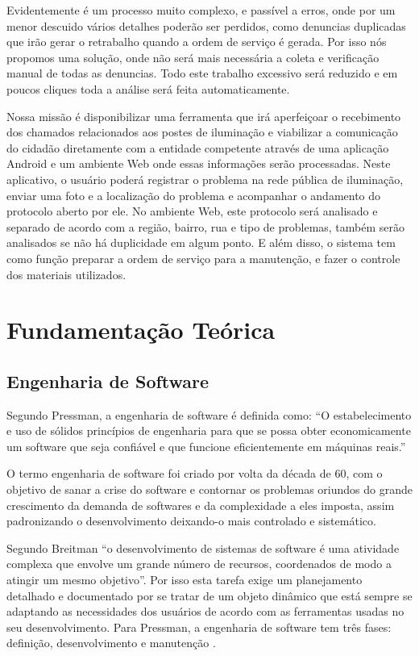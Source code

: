 \documentclass[
	article,			%
	11pt,				%
	oneside,			%
	a4paper,			%
	english,			%
	brazil,				%
	sumario=tradicional
	]{abntex2}
\begin{document}
Evidentemente é um processo muito complexo, e passível a erros, onde por um menor descuido vários detalhes poderão ser perdidos, como denuncias duplicadas que irão gerar o retrabalho quando a ordem de serviço é gerada.
Por isso nós propomos uma solução, onde não será mais necessária a coleta e verificação manual de todas as denuncias.
Todo este trabalho excessivo será reduzido e em poucos cliques toda a análise será feita automaticamente.

Nossa missão é disponibilizar uma ferramenta que irá aperfeiçoar o recebimento dos chamados relacionados aos postes de iluminação e viabilizar a comunicação do cidadão diretamente com a entidade competente através de uma aplicação Android e um ambiente Web onde essas informações serão processadas.
Neste aplicativo, o usuário poderá registrar o problema na rede pública de iluminação, enviar uma foto e a localização do problema e acompanhar o andamento do protocolo aberto por ele.
No ambiente Web, este protocolo será analisado e separado de acordo com a região, bairro, rua e tipo de problemas, também serão analisados se não há duplicidade em algum ponto.
E além disso, o sistema tem como função preparar a ordem de serviço para a manutenção, e fazer o controle dos materiais utilizados.

\section{Fundamentação Teórica}

\subsection{Engenharia de Software}

Segundo Pressman, a engenharia de software é definida como: “O estabelecimento e uso de sólidos princípios de engenharia para que se possa obter economicamente um software que seja confiável e que funcione eficientemente em máquinas reais.”\cite{pressman}

O termo engenharia de software foi criado por volta da década de 60, com o objetivo de sanar a crise do software e contornar os problemas oriundos do grande crescimento da demanda de softwares e da complexidade a eles imposta, assim padronizando o desenvolvimento deixando-o mais controlado e sistemático.

Segundo Breitman “o desenvolvimento de sistemas de software é uma atividade complexa que envolve um grande número de recursos, coordenados de modo a atingir um mesmo objetivo”. \cite{breitman}
Por isso esta tarefa exige um planejamento detalhado e documentado por se tratar de um objeto dinâmico que está sempre se adaptando as necessidades dos usuários de acordo com as ferramentas usadas no seu desenvolvimento.
Para Pressman, a engenharia de software tem três fases: definição, desenvolvimento e manutenção \cite{pressman}.
\end{document}

